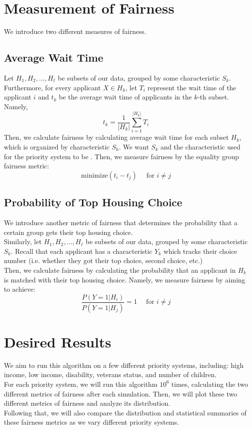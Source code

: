 \documentclass[11pt]{article}
\begin{document}
\section{Measurement of Fairness}
We introduce two different measures of fairness.
\subsection{Average Wait Time}
Let $H_1, H_2, \dots, H_\ell$ be subsets of our data, grouped by some characteristic $S_k$. Furthermore, for every applicant $X \in H_k$, let $T_i$ represent the wait time of the applicant $i$ and $t_k$ be the average wait time of applicants in the $k$-th subset. Namely,
\[t_k = \frac{1}{|H_k|}\sum_{i=1}^{|H_k|}T_i\]
Then, we calculate fairness by calculating average wait time for each subset $H_k$, which is organized by characteristic $S_k$. We want $S_k$ and the characteristic used for the priority system to be . Then, we measure fairness by the equality group fairness metric:
\[\text{minimize}(t_i - t_j) \quad \text{ for } i \neq j\]
\subsection{Probability of Top Housing Choice}
We introduce another metric of fairness that determines the probability that a certain group gets their top housing choice. \\
\newline
Similarly, let $H_1, H_2, \dots, H_\ell$ be subsets of our data, grouped by some characteristic $S_k$. Recall that each applicant has a characteristic $Y_k$ which tracks their choice number (i.e. whether they got their top choice, second choice, etc.) \\
\newline
Then, we calculate fairness by calculating the probability that an applicant in $H_k$ is matched with their top housing choice. Namely, we measure fairness by aiming to achieve:
\[\frac{P(Y = 1 | H_i)}{P(Y = 1 | H_j)} = 1 \quad \text{ for } i \neq j\]
\section{Desired Results}
We aim to run this algorithm on a few different priority systems, including: high income, low income, disability, veterans status, and number of children. \\
\newline
For each priority system, we will run this algorithm $10^6$ times, calculating the two different metrics of fairness after each simulation. Then, we will plot these two different metrics of fairness and analyze its distribution. \\
\newline
Following that, we will also compare the distribution and statistical summaries of these fairness metrics as we vary different priority systems.
\end{document}
